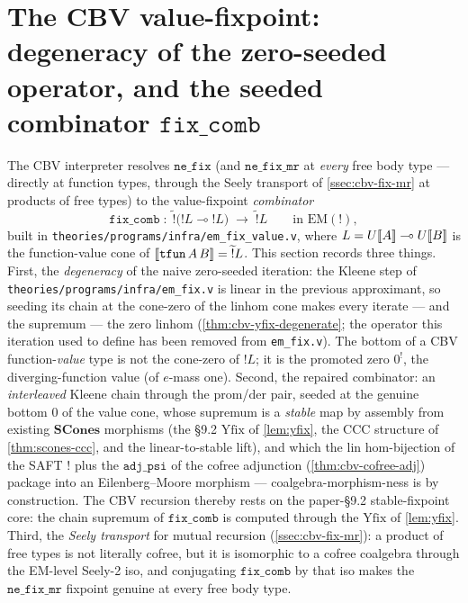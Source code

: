 \section{The CBV value-fixpoint: degeneracy of the zero-seeded
operator, and the seeded combinator $\mathtt{fix\_comb}$}%
\label{sec:cbv-yfix-fun}

The CBV interpreter resolves $\mathtt{ne\_fix}$ (and
$\mathtt{ne\_fix\_mr}$ at \emph{every} free body type --- directly at
function types, through the Seely transport of
\autoref{ssec:cbv-fix-mr} at products of free types) to the
value-fixpoint \emph{combinator}
\[
  \mathtt{fix\_comb}
  \;:\;
  \widetilde{\mathord{!}}\bigl(\mathord{!}L \multimap \mathord{!}L\bigr)
  \;\longrightarrow\;
  \widetilde{\mathord{!}}L
  \qquad\text{in } \mathrm{EM}(\mathord{!}),
\]
built in \texttt{theories/programs/infra/em\_fix\_value.v}, where
$L = U[\![ A ]\!] \multimap U[\![ B ]\!]$ is the function-value cone of
$[\![ \mathtt{tfun}\,A\,B ]\!] = \widetilde{\mathord{!}}L$. This section
records three things. First, the \emph{degeneracy} of the naive
zero-seeded iteration: the Kleene step of
\texttt{theories/programs/infra/em\_fix.v} is linear in the previous
approximant, so seeding its chain at the cone-zero of the linhom cone
makes every iterate --- and the supremum --- the zero linhom
(\autoref{thm:cbv-yfix-degenerate}; the operator this iteration used
to define has been removed from \texttt{em\_fix.v}). The bottom of a CBV
function-\emph{value} type is not the cone-zero of $\mathord{!}L$; it is
the promoted zero $0^!$, the diverging-function value (of
$e$-mass one). Second, the repaired combinator: an \emph{interleaved}
Kleene chain through the $\mathrm{prom}$/$\mathrm{der}$ pair, seeded at
the genuine bottom $0$ of the value cone, whose supremum is a
\emph{stable} map by assembly from existing $\mathbf{SCones}$
morphisms (the \S9.2 $\mathrm{Yfix}$ of \autoref{lem:yfix},
the CCC structure of \autoref{thm:scones-ccc}, and the
linear-to-stable lift), and which the $\mathrm{lin}$ hom-bijection of
the SAFT $\mathord{!}$ plus the $\mathtt{adj\_psi}$ of the cofree
adjunction (\autoref{thm:cbv-cofree-adj}) package into an
Eilenberg--Moore morphism --- coalgebra-morphism-ness is by
construction. The CBV recursion thereby rests on the paper-\S9.2
stable-fixpoint core: the chain supremum of $\mathtt{fix\_comb}$ is
computed through the $\mathrm{Yfix}$ of \autoref{lem:yfix}. Third,
the \emph{Seely transport} for mutual recursion
(\autoref{ssec:cbv-fix-mr}): a product of free types is not
literally cofree, but it is isomorphic to a cofree coalgebra through
the EM-level Seely-2 iso, and conjugating $\mathtt{fix\_comb}$ by
that iso makes the $\mathtt{ne\_fix\_mr}$ fixpoint genuine at every
free body type.

